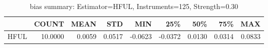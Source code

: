 \begin{table}[ht]
\centering
\caption{bias summary: Estimator=HFUL, Instruments=125, Strength=0.30}
\begin{tabular}{lrrrrrrrr}
\toprule
 & COUNT & MEAN & STD & MIN & 25\% & 50\% & 75\% & MAX \\
\midrule
HFUL & 10.0000 & 0.0059 & 0.0517 & -0.0623 & -0.0372 & 0.0130 & 0.0314 & 0.0833 \\
\bottomrule
\end{tabular}
\end{table}

